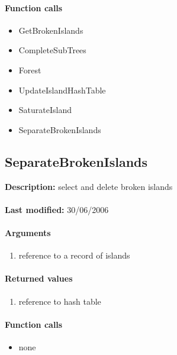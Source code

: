 \paragraph{Function calls}
\begin{itemize}
\item GetBrokenIslands
\item CompleteSubTrees
\item Forest
\item UpdateIslandHashTable
\item SaturateIsland
\item SeparateBrokenIslands
\end{itemize}

\subsection{SeparateBrokenIslands}
\textbf{Description:} select and delete broken islands\\
\\\textbf{Last modified:} 30/06/2006

\paragraph{Arguments}
\begin{enumerate}
\item reference to a record of islands
\end{enumerate}

\paragraph{Returned values}
\begin{enumerate}
\item reference to hash table
\end{enumerate}

\paragraph{Function calls}
\begin{itemize}
\item none
\end{itemize}

